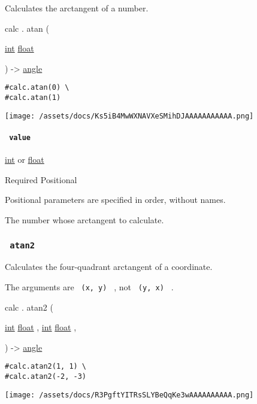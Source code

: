 Calculates the arctangent of a number.

calc { . } { atan } (

{ \href{/docs/reference/foundations/int/}{int}
\href{/docs/reference/foundations/float/}{float} }

) -\textgreater{} \href{/docs/reference/layout/angle/}{angle}

\begin{verbatim}
#calc.atan(0) \
#calc.atan(1)
\end{verbatim}

\texttt{[image: /assets/docs/Ks5iB4MwWXNAVXeSMihDJAAAAAAAAAAA.png]}

\paragraph{\texorpdfstring{\texttt{\ value\ }}{ value }}\label{functions-atan-value}

\href{/docs/reference/foundations/int/}{int} {or}
\href{/docs/reference/foundations/float/}{float}

{Required} {{ Positional }}

\label{functions-atan-value-positional-tooltip}
Positional parameters are specified in order, without names.

The number whose arctangent to calculate.

\subsubsection{\texorpdfstring{\texttt{\ atan2\ }}{ atan2 }}\label{functions-atan2}

Calculates the four-quadrant arctangent of a coordinate.

The arguments are \texttt{\ (x,\ y)\ } , not \texttt{\ (y,\ x)\ } .

calc { . } { atan2 } (

{ \href{/docs/reference/foundations/int/}{int}
\href{/docs/reference/foundations/float/}{float} , } {
\href{/docs/reference/foundations/int/}{int}
\href{/docs/reference/foundations/float/}{float} , }

) -\textgreater{} \href{/docs/reference/layout/angle/}{angle}

\begin{verbatim}
#calc.atan2(1, 1) \
#calc.atan2(-2, -3)
\end{verbatim}

\texttt{[image: /assets/docs/R3PgftYITRsSLYBeQqKe3wAAAAAAAAAA.png]}

